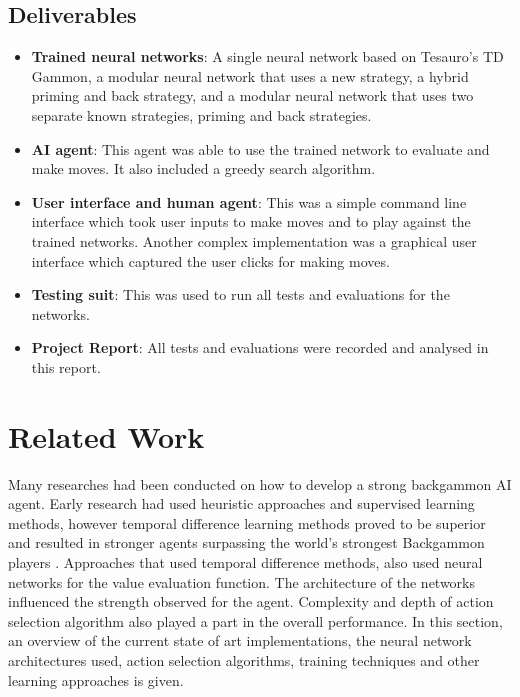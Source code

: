 \documentclass[12pt,a4paper]{article}
\begin{document}
\subsection{Deliverables}
\begin{itemize}
    \item \textbf{Trained neural networks}: A single neural network based on Tesauro's TD Gammon, a modular neural network that uses a new strategy, a hybrid priming and back strategy, and a modular neural network that uses two separate known strategies, priming and back strategies.
    \item \textbf{AI agent}: This agent was able to use the trained network to evaluate and make moves. It also included a greedy search algorithm.
    \item \textbf{User interface and human agent}: This was a simple command line interface which took user inputs to make moves and to play against the trained networks. Another complex implementation was a graphical user interface which captured the user clicks for making moves.
    \item \textbf{Testing suit}: This was used to run all tests and evaluations for the networks.
    \item \textbf{Project Report}: All tests and evaluations were recorded and analysed in this report.
\end{itemize}

\section{Related Work}
Many researches had been conducted on how to develop a strong backgammon AI agent. Early research had used heuristic approaches and supervised learning methods, however temporal difference learning methods proved to be superior and resulted in stronger agents surpassing the world's strongest Backgammon players \cite{DBLP:journals/ai/Tesauro02}. Approaches that used temporal difference methods, also used neural networks for the  value evaluation function. The architecture of the networks influenced the strength observed for the agent. Complexity and depth of action selection algorithm also played a part in the overall performance. In this section, an overview of the current state of art implementations, the neural network architectures used, action selection algorithms, training techniques and other learning approaches is given. 
\end{document}
